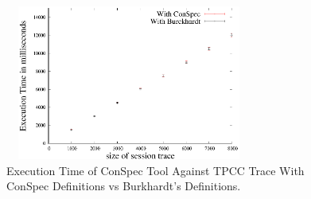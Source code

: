 \documentclass[journal, compsoc]{IEEEtran}
\begin{document}
	\begin{figure}%
		\includegraphics[width=3.2in,height=2in]
		{conspecTPCCvarhist.eps} %
		\caption{Execution Time of ConSpec Tool Against TPCC Trace With ConSpec Definitions vs Burkhardt's Definitions.}
		\label{fig:examplefulltpcc}
	\end{figure}
\end{document}
